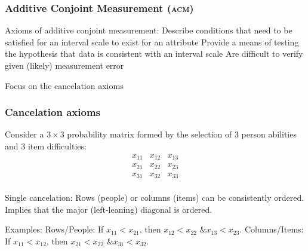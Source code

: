 \documentclass[10pt,serif,professionalfont]{beamer}
\begin{document}
\begin{frame}
    \frametitle{Additive Conjoint Measurement (\textsc{acm})}

    \begin{outline}
        \1 Axioms of additive conjoint measurement:
            \2 Describe conditions that need to be satisfied for an interval scale to exist for an attribute
            \2 Provide a means of testing the hypothesis that data is consistent with an interval scale
            \2 Are difficult to verify given (likely) measurement error

        \vspace{0.25cm}

        \1 Focus on the cancelation axioms
    \end{outline}

\end{frame}

\begin{frame}
    \frametitle{Cancelation axioms}

    Consider a $3 \times 3$ probability matrix formed by the selection of 3 person abilities and 3 item difficulties:
    \[
    \begin{array}{ccc}
      x_{11} & x_{12} & x_{13}  \\
      x_{21} & x_{22} & x_{23} \\
      x_{31} & x_{32} & x_{33} \\
    \end{array}
    \]

    \begin{outline}
        \1 Single cancelation: Rows (people) or columns (items) can be consistently ordered.
            \2 Implies that the major (left-leaning) diagonal is ordered.

        \vspace{0.1cm}

        \1 Examples:
            \2 Rows/People: If $x_{11}<x_{21} \text{, then } x_{12}<x_{22} \text{ \& } x_{13}<x_{23}$.
            \2 Columns/Items: If $x_{11}<x_{12} \text{, then } x_{21}<x_{22} \text{ \& } x_{31}<x_{32}$.
    \end{outline}

\end{frame}
\end{document}
